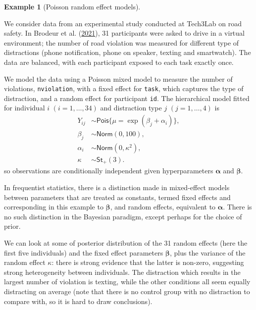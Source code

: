 \documentclass[
  11pt,
  letterpaper,
]{scrbook}
\theoremstyle{definition}
\newtheorem{example}{Example}[chapter]
\theoremstyle{definition}
\theoremstyle{definition}
\theoremstyle{plain}
\theoremstyle{remark}
\begin{document}
\begin{example}[Poisson random effect
models]\protect\hypertarget{exm-randomeffects}{}\label{exm-randomeffects}

We consider data from an experimental study conducted at Tech3Lab on
road safety. In Brodeur et al.
(\protect\hyperlink{ref-Brodeur:2021}{2021}), 31 participants were asked
to drive in a virtual environment; the number of road violation was
measured for different type of distractions (phone notification, phone
on speaker, texting and smartwatch). The data are balanced, with each
participant exposed to each task exactly once.

We model the data using a Poisson mixed model to measure the number of
violations, \texttt{nviolation}, with a fixed effect for \texttt{task},
which captures the type of distraction, and a random effect for
participant \texttt{id}. The hierarchical model fitted for individual
\(i\) \((i=1, \ldots, 34)\) and distraction type \(j\)
\((j=1, \ldots, 4)\) is \begin{align*}
Y_{ij} &\sim \mathsf{Pois}\{\mu = \exp(\beta_{j} + \alpha_i)\},\\
\beta_j &\sim \mathsf{Norm}(0, 100), \\
\alpha_i &\sim \mathsf{Norm}(0, \kappa^2), \\
\kappa &\sim \mathsf{St}_{+}(3).
\end{align*} so observations are conditionally independent given
hyperparameters \(\boldsymbol{\alpha}\) and \(\boldsymbol{\beta}\).

In frequentist statistics, there is a distinction made in mixed-effect
models between parameters that are treated as constants, termed fixed
effects and corresponding in this example to \(\boldsymbol{\beta}\), and
random effects, equivalent to \(\boldsymbol{\alpha}\). There is no such
distinction in the Bayesian paradigm, except perhaps for the choice of
prior.

We can look at some of posterior distribution of the 31 random effects
(here the first five individuals) and the fixed effect parameters
\(\boldsymbol{\beta}\), plus the variance of the random effect
\(\kappa\): there is strong evidence that the latter is non-zero,
suggesting strong heterogeneity between individuals. The distraction
which results in the largest number of violation is texting, while the
other conditions all seem equally distracting on average (note that
there is no control group with no distraction to compare with, so it is
hard to draw conclusions).


\end{example}
\end{document}
